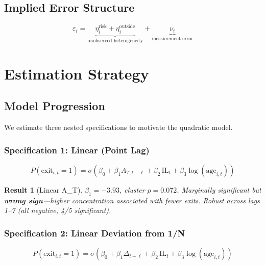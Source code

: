 \documentclass[11pt,a4paper]{article}
\newtheorem{result}{Result}
\begin{document}
\subsection{Implied Error Structure}

\begin{equation}\label{eq:error-structure}
  \varepsilon_i = \underbrace{\eta_i^{\text{risk}} +
  \eta_i^{\text{outside}}}_{\text{unobserved heterogeneity}}
  + \underbrace{\nu_i}_{\text{measurement error}}
\end{equation}


\section{Estimation Strategy}\label{sec:estimation}

\subsection{Model Progression}

We estimate three nested specifications to motivate the quadratic model.

\subsubsection{Specification 1: Linear (Point Lag)}

\begin{equation}\label{eq:linear}
  P(\text{exit}_{i,t} = 1) = \sigma\!\left(
    \beta_0 + \beta_1 A_{T,t-\ell} + \beta_2 \, \text{IL}_t
    + \beta_3 \log(\text{age}_{i,t})
  \right)
\end{equation}

\begin{result}[Linear A\_T]\label{res:linear}
$\beta_1 = -3.93$, cluster $p = 0.072$. Marginally significant but
\textbf{wrong sign}---higher concentration associated with fewer exits.
Robust across lags 1--7 (all negative, 4/5 significant).
\end{result}

\subsubsection{Specification 2: Linear Deviation from 1/N}

\begin{equation}\label{eq:deviation-linear}
  P(\text{exit}_{i,t} = 1) = \sigma\!\left(
    \beta_0 + \beta_1 \Delta_{t-\ell} + \beta_2 \, \text{IL}_t
    + \beta_3 \log(\text{age}_{i,t})
  \right)
\end{equation}
\end{document}
